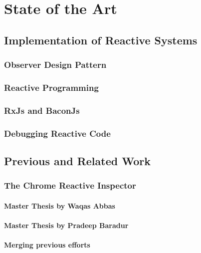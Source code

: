 \chapter{State of the Art} \label{chap:State of the Art}

\section{Implementation of Reactive Systems}

	\subsection{Observer Design Pattern}

	\subsection{Reactive Programming}

	\subsection{RxJs and BaconJs}

	\subsection{Debugging Reactive Code}


\section{Previous and Related Work}
	\subsection{The Chrome Reactive Inspector}
		\subsubsection{Master Thesis by Waqas Abbas}
		\subsubsection{Master Thesis by Pradeep Baradur}
		\subsubsection{Merging previous efforts}

